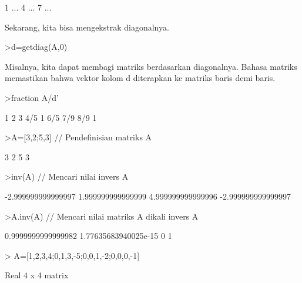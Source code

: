 \documentclass[a4paper,10pt]{article}
\begin{document}
\begin{eulernotebook}
\begin{eulercomment}
\begin{eulercomment}
\begin{eulercomment}
\begin{eulercomment}
\begin{eulercomment}
\begin{eulercomment}
\begin{euleroutput}
                        1     ...
                        4     ...
                        7     ...
\end{euleroutput}
\begin{eulercomment}
Sekarang, kita bisa mengekstrak diagonalnya.
\end{eulercomment}
\begin{eulerprompt}
>d=getdiag(A,0)
\end{eulerprompt}
\begin{euleroutput}
  [1,  5,  9]
\end{euleroutput}
\begin{eulercomment}
Misalnya, kita dapat membagi matriks berdasarkan diagonalnya. Bahasa
matriks memastikan bahwa vektor kolom d diterapkan ke matriks baris
demi baris.
\end{eulercomment}
\begin{eulerprompt}
>fraction A/d'
\end{eulerprompt}
\begin{euleroutput}
          1         2         3 
        4/5         1       6/5 
        7/9       8/9         1 
\end{euleroutput}
\begin{eulerprompt}
>A=[3,2;5,3] // Pendefinisian matriks A
\end{eulerprompt}
\begin{euleroutput}
                        3                       2 
                        5                       3 
\end{euleroutput}
\begin{eulerprompt}
>inv(A) // Mencari nilai invers A
\end{eulerprompt}
\begin{euleroutput}
       -2.999999999999997       1.999999999999999 
        4.999999999999996      -2.999999999999997 
\end{euleroutput}
\begin{eulerprompt}
>A.inv(A) // Mencari nilai matriks A dikali invers A
\end{eulerprompt}
\begin{euleroutput}
       0.9999999999999982    1.77635683940025e-15 
                        0                       1 
\end{euleroutput}
\begin{eulerprompt}
> A=[1,2,3,4;0,1,3,-5;0,0,1,-2;0,0,0,-1]
\end{eulerprompt}
\begin{euleroutput}
  Real 4 x 4 matrix
  

\end{euleroutput}
\end{eulercomment}
\end{eulercomment}
\end{eulercomment}
\end{eulercomment}
\end{eulercomment}
\end{eulercomment}
\end{eulernotebook}
\end{document}
